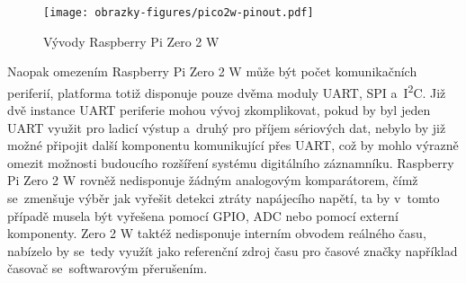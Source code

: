 \begin{figure}[h]
    \centering
    \texttt{[image: obrazky-figures/pico2w-pinout.pdf]}
    
    \caption{Vývody Raspberry Pi Zero 2 W~\cite{raspberry_pi_pico_2w}}
    \label{fig:raspberry-pi-zero-2w}
\end{figure}

Naopak omezením Raspberry Pi Zero 2 W může být počet komunikačních periferií, platforma totiž disponuje pouze dvěma moduly UART, SPI a~I\textsuperscript{2}C. Již dvě instance UART periferie mohou vývoj zkomplikovat, pokud by byl jeden UART využit pro ladicí výstup a~druhý pro příjem sériových dat, nebylo by již možné připojit další komponentu komunikující přes UART, což by mohlo výrazně omezit možnosti budoucího rozšíření systému digitálního záznamníku. Raspberry Pi Zero 2 W rovněž nedisponuje žádným analogovým komparátorem, čímž se~zmenšuje výběr jak vyřešit detekci ztráty napájecího napětí, ta by v~tomto případě musela být vyřešena pomocí GPIO, ADC nebo pomocí externí komponenty. Zero 2 W taktéž nedisponuje interním obvodem reálného času, nabízelo by se~tedy využít jako referenční zdroj času pro časové značky například časovač se~softwarovým přerušením.~\cite{raspberry_pi_pico_2w}






